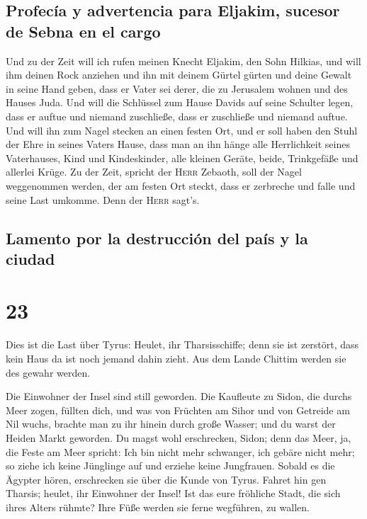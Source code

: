 \hypertarget{profecuxeda-y-advertencia-para-eljakim-sucesor-de-sebna-en-el-cargo}{%
\subsection{Profecía y advertencia para Eljakim, sucesor de Sebna en el
cargo}\label{profecuxeda-y-advertencia-para-eljakim-sucesor-de-sebna-en-el-cargo}}

 Und zu der Zeit will ich rufen meinen Knecht Eljakim,
den Sohn Hilkias,  und will ihm deinen Rock anziehen und
ihn mit deinem Gürtel gürten und deine Gewalt in seine Hand geben, dass
er Vater sei derer, die zu Jerusalem wohnen und des Hauses Juda.
 Und will die Schlüssel zum Hause Davids auf seine
Schulter legen, dass er auftue und niemand zuschließe, dass er
zuschließe und niemand auftue.  Und will ihn zum Nagel
stecken an einen festen Ort, und er soll haben den Stuhl der Ehre in
seines Vaters Hause,  dass man an ihn hänge alle
Herrlichkeit seines Vaterhauses, Kind und Kindeskinder, alle kleinen
Geräte, beide, Trinkgefäße und allerlei Krüge.  Zu der
Zeit, spricht der \textsc{Herr} Zebaoth, soll der Nagel weggenommen
werden, der am festen Ort steckt, dass er zerbreche und falle und seine
Last umkomme. Denn der \textsc{Herr} sagt's.

\hypertarget{lamento-por-la-destrucciuxf3n-del-pauxeds-y-la-ciudad}{%
\subsection{Lamento por la destrucción del país y la
ciudad}\label{lamento-por-la-destrucciuxf3n-del-pauxeds-y-la-ciudad}}

\hypertarget{section-22}{%
\section{23}\label{section-22}}

 Dies ist die Last über Tyrus: Heulet, ihr Tharsisschiffe;
denn sie ist zerstört, dass kein Haus da ist noch jemand dahin zieht.
Aus dem Lande Chittim werden sie des gewahr werden.

 Die Einwohner der Insel sind still geworden. Die
Kaufleute zu Sidon, die durchs Meer zogen, füllten dich, 
und was von Früchten am Sihor und von Getreide am Nil wuchs, brachte man
zu ihr hinein durch große Wasser; und du warst der Heiden Markt
geworden.  Du magst wohl erschrecken, Sidon; denn das
Meer, ja, die Feste am Meer spricht: Ich bin nicht mehr schwanger, ich
gebäre nicht mehr; so ziehe ich keine Jünglinge auf und erziehe keine
Jungfrauen.  Sobald es die Ägypter hören, erschrecken sie
über die Kunde von Tyrus.  Fahret hin gen Tharsis; heulet,
ihr Einwohner der Insel!  Ist das eure fröhliche Stadt,
die sich ihres Alters rühmte? Ihre Füße werden sie ferne wegführen, zu
wallen.

